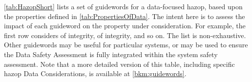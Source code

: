 \autoref{tab:HazopShort} lists a set of guidewords for a data-focused \gls{hazop}, based upon the properties defined in \autoref{tab:PropertiesOfData}. The intent here is to assess the impact of each guideword on the property under consideration. For example, the first row considers  of integrity,  of integrity, and so on.
The list is non-exhaustive. Other guidewords may be useful for particular systems, or may be used to ensure the Data Safety Assessment is fully integrated within the system safety assessment. Note that a more detailed version of this table, including specific \gls{hazop} Data Considerations, is available at \autoref{bkm:guidewords}.


